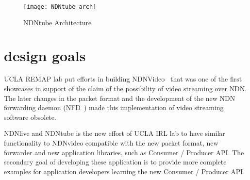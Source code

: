 
\begin{figure*}[htbp]
  \centering
  \texttt{[image: NDNtube\_arch]}
  \caption{NDNtube Architecture}
  \label{fig:NDNtube_arch}
\end{figure*}

\section{design goals} %
\label{sec:design_goals}
UCLA REMAP lab put efforts in building NDNVideo~\cite{ndnvideo} that was one of the first showcases in support of the claim of the possibility of video streaming over NDN. The later changes in the packet format and the development of the new NDN forwarding daemon (NFD~\cite{nfd-guide}) made this implementation of video streaming software obsolete. 

NDNlive and NDNtube is the new effort of UCLA IRL lab to have similar functionality to NDNvideo compatible with the new packet format, new forwarder and new application libraries, such as Consumer / Producer API. The secondary goal of developing these application is to provide more complete examples for application developers learning the new Consumer / Producer API.

